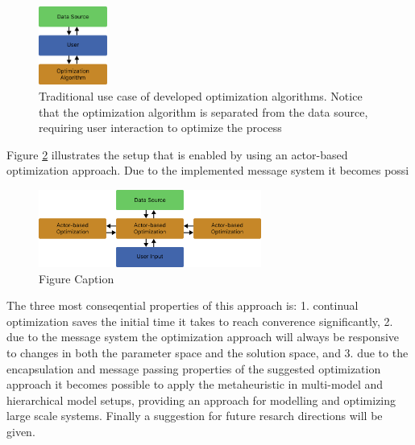 \documentclass[preprint,12pt,authoryear]{elsarticle}
\begin{document}
\begin{figure}[H]%
\centering%
\includegraphics[width=0.2\textwidth]{figures/normal-setup.pdf}
\caption{Traditional use case of developed optimization algorithms. Notice that the optimization algorithm is separated from the data source, requiring user interaction to optimize the process}
\label{fig:normal-setup}
\end{figure}

Figure \ref{fig:actor-setup} illustrates the setup that is enabled by using an actor-based optimization approach. Due to the implemented message system it becomes possi 
\begin{figure}[H]%
\centering%
\includegraphics[width=0.65\textwidth]{figures/actor-setup.pdf}
\caption{Figure Caption}\label{fig:actor-setup}
\end{figure}

The three most conseqential properties of this approach is: 1. continual optimization saves the initial time it takes to reach converence significantly, 2. due to the message system the 
optimization approach will always be responsive to changes in both the parameter space
and the solution space, and 3. due to the encapsulation and message passing properties of the suggested optimization approach it becomes possible to apply the metaheuristic in multi-model 
and hierarchical model setups, providing an
approach for modelling and optimizing large scale systems. Finally a suggestion for future resarch directions will be given.
\end{document}
